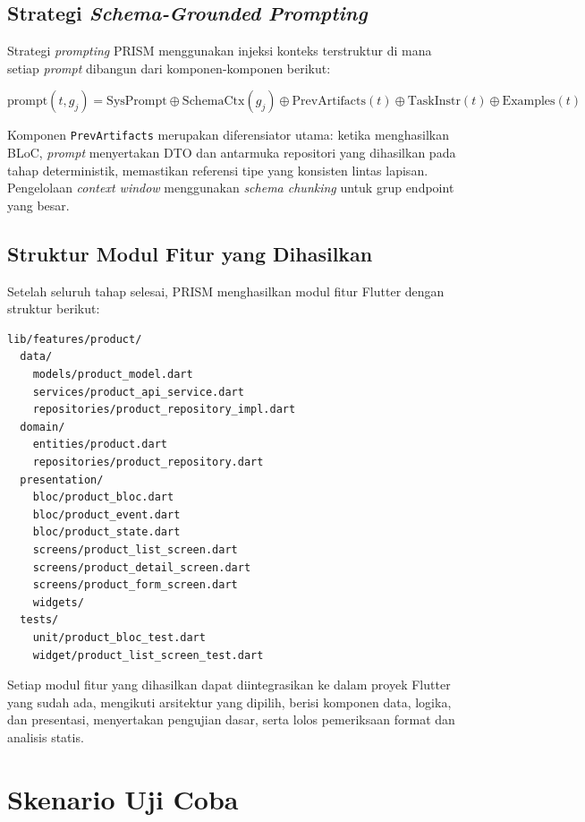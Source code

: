 \subsection{Strategi \textit{Schema-Grounded Prompting}}

Strategi \textit{prompting} PRISM menggunakan injeksi konteks terstruktur di mana setiap \textit{prompt} dibangun dari komponen-komponen berikut:

\begin{equation}
    \text{prompt}(t, g_j) = \text{SysPrompt} \oplus \text{SchemaCtx}(g_j) \oplus \text{PrevArtifacts}(t) \oplus \text{TaskInstr}(t) \oplus \text{Examples}(t)
\end{equation}

Komponen \texttt{PrevArtifacts} merupakan diferensiator utama: ketika menghasilkan BLoC, \textit{prompt} menyertakan DTO dan antarmuka repositori yang dihasilkan pada tahap deterministik, memastikan referensi tipe yang konsisten lintas lapisan. Pengelolaan \textit{context window} menggunakan \textit{schema chunking} untuk grup endpoint yang besar.

\subsection{Struktur Modul Fitur yang Dihasilkan}

Setelah seluruh tahap selesai, PRISM menghasilkan modul fitur Flutter dengan struktur berikut:

\begin{lstlisting}[language=text]
lib/features/product/
  data/
    models/product_model.dart
    services/product_api_service.dart
    repositories/product_repository_impl.dart
  domain/
    entities/product.dart
    repositories/product_repository.dart
  presentation/
    bloc/product_bloc.dart
    bloc/product_event.dart
    bloc/product_state.dart
    screens/product_list_screen.dart
    screens/product_detail_screen.dart
    screens/product_form_screen.dart
    widgets/
  tests/
    unit/product_bloc_test.dart
    widget/product_list_screen_test.dart
\end{lstlisting}

Setiap modul fitur yang dihasilkan dapat diintegrasikan ke dalam proyek Flutter yang sudah ada, mengikuti arsitektur yang dipilih, berisi komponen data, logika, dan presentasi, menyertakan pengujian dasar, serta lolos pemeriksaan format dan analisis statis.

\section{Skenario Uji Coba}

